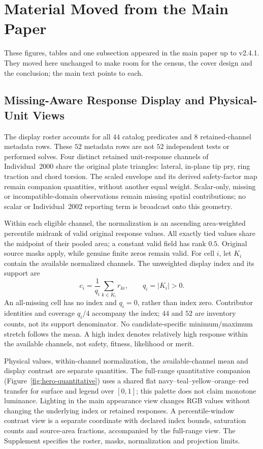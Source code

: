 \section{Material Moved from the Main Paper}
\label{sec:moved-from-main}
These figures, tables and one subsection appeared in the main paper up to v2.4.1. They moved here unchanged to make room for the census, the cover design and the conclusion; the main text points to each.

\subsection{Missing-Aware Response Display and Physical-Unit Views}
\label{sec:moved-display}
The display roster accounts for all $44$ catalog predicates and $8$ retained-channel metadata rows. These $52$ metadata rows are not $52$ independent tests or performed solves. Four distinct retained unit-response channels of Individual~2000 share the original plate triangles: lateral, in-plane tip pry, ring traction and chord torsion. The scaled envelope and its derived safety-factor map remain companion quantities, without another equal weight. Scalar-only, missing or incompatible-domain observations remain missing spatial contributions; no scalar or Individual~2002 reporting term is broadcast onto this geometry.

Within each eligible channel, the normalization is an ascending area-weighted percentile midrank of valid original response values. All exactly tied values share the midpoint of their pooled area; a constant valid field has rank $0.5$. Original source masks apply, while genuine finite zeros remain valid. For cell $i$, let $K_i$ contain the available normalized channels. The unweighted display index and its support are
\begin{equation}
 c_i=\frac{1}{q_i}\sum_{k\in K_i}r_{ki},\qquad q_i=|K_i|>0.
\end{equation}
An all-missing cell has no index and $q_i=0$, rather than index zero. Contributor identities and coverage $q_i/4$ accompany the index; $44$ and $52$ are inventory counts, not its support denominator. No candidate-specific minimum/maximum stretch follows the mean. A high index denotes relatively high response within the available channels, not safety, fitness, likelihood or merit.

Physical values, within-channel normalization, the available-channel mean and display contrast are separate quantities. The full-range quantitative companion (Figure~\ref{fig:hero-quantitative}) uses a shared flat navy--teal--yellow--orange--red transfer for surface and legend over $[0,1]$; this palette does not claim monotone luminance. Lighting in the main appearance view changes RGB values without changing the underlying index or retained responses. A percentile-window contrast view is a separate coordinate with declared index bounds, saturation counts and source-area fractions, accompanied by the full-range view. The Supplement specifies the roster, masks, normalization and projection limits.



